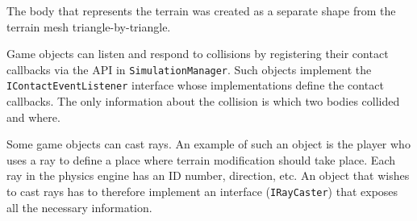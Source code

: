 The body that represents the terrain was created as a separate shape from the terrain mesh triangle-by-triangle.

Game objects can listen and respond to collisions by registering their contact callbacks via the API in \texttt{SimulationManager}.
Such objects implement the \texttt{IContactEventListener} interface whose implementations define the contact callbacks.
The only information about the collision is which two bodies collided and where.

Some game objects can cast rays.
An example of such an object is the player who uses a ray to define a place where terrain modification should take place.
Each ray in the physics engine has an ID number, direction, etc.
An object that wishes to cast rays has to therefore implement an interface (\texttt{IRayCaster}) that exposes all the necessary information.
